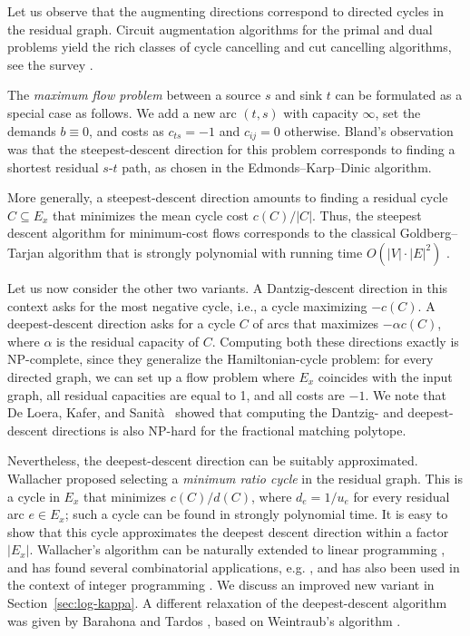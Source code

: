 \documentclass[11pt, a4paper]{article}
\newcommand{\1}{\mathbbm{1}}
\theoremstyle{case}
\begin{document}
Let us observe that the augmenting directions correspond to directed cycles in the residual graph. Circuit augmentation algorithms for the primal and dual problems yield the rich classes of cycle cancelling and cut cancelling algorithms, see the survey \cite{Shigeno2000}.

The \emph{maximum flow problem} between a source $s$ and sink $t$ can be formulated as a special case as follows. We add a new arc $(t,s)$ with capacity $\infty$, set the demands $b\equiv 0$, and costs as $c_{ts}=-1$ and $c_{ij}=0$ otherwise. 
Bland's \cite{Bland76} observation was that the steepest-descent direction for this problem corresponds to finding a shortest residual $s$-$t$ path, as chosen in the Edmonds--Karp--Dinic algorithm. 

More generally, a steepest-descent direction amounts to finding a residual cycle $C\subseteq E_x$ that minimizes the mean cycle cost $c(C)/|C|$. Thus, the steepest descent algorithm for minimum-cost flows corresponds to the classical Goldberg--Tarjan algorithm \cite{Goldberg89} that is strongly polynomial with running  time $O(|V|\cdot |E|^2)$ \cite{Radzik-Goldberg}.

Let us now consider the other two variants. A Dantzig-descent direction in this context asks for the most negative cycle, i.e., a cycle maximizing $-c(C)$. A deepest-descent direction asks for a cycle $C$ of arcs that maximizes $-\alpha c(C)$, where $\alpha$ is the residual capacity of $C$. Computing both these directions exactly is NP-complete, since they generalize the  Hamiltonian-cycle problem: for every  directed graph, we can set up a flow problem where $E_x$ coincides with the input graph, all residual capacities are equal to 1, and all costs are $-1$. We note that De Loera, Kafer, and Sanit\`a~\cite{DKS19} showed that computing the Dantzig- and deepest-descent directions is also NP-hard for the fractional matching polytope.

Nevertheless, the deepest-descent direction can be suitably approximated.
Wallacher \cite{Wallacher} proposed selecting a \emph{minimum ratio cycle} in the residual graph. This is a cycle in $E_x$ that minimizes $c(C)/d(C)$, where $d_e=1/u_e$ for every residual arc $e\in E_x$; such a cycle can be found in strongly polynomial time. It is easy to show that this cycle approximates the deepest descent direction within a factor $|E_x|$.
Wallacher's  algorithm can be naturally extended to  linear programming \cite{mccormick-shioura-not-strongly}, and has found several combinatorial applications, e.g. \cite{Wallacher1999,Wayne02}, and has also been used in the context of integer programming \cite{Schulz1999}. We discuss an improved new variant in Section~\ref{sec:log-kappa}.
A different relaxation of the deepest-descent algorithm was given by Barahona and Tardos \cite{Barahona1989}, based on Weintraub's algorithm \cite{Weintraub1974}.
\end{document}
